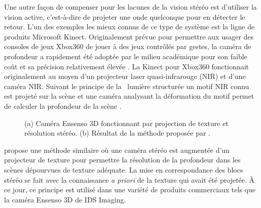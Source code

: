 Une autre façon de compenser pour les lacunes de la vision stéréo est d'utiliser la vision active, c'est-à-dire de projeter une onde quelconque pour en détecter le retour. L'un des exemples les mieux connus de ce type de système est la ligne de produits Microsoft Kinect. Originalement prévue pour permettre aux usager des consoles de jeux Xbox360 de jouer à des jeux contrôlés par gestes, la caméra de profondeur a rapidement été adoptée par le milieu académique pour son faible coût et sa précision relativement élevée \citep{khoshelham2012}. La Kinect pour Xbox360 fonctionnait originalement au moyen d'un projecteur laser quasi-infrarouge (NIR) et d'une caméra NIR. Suivant le principe de la \guillemotleft \ lumière structurée \guillemotright un motif NIR connu est projeté sur la scène et une caméra analysant la déformation du motif permet de calculer la profondeur de la scène \citep{Zhang2012}.

\begin{figure}[!h]
  \centering
  \caption[Caméras 3D par projection de texture]{
    (a) Caméra Ensenso 3D fonctionnant par projection de texture et résolution stéréo.
    (b) Résultat de la méthode proposée par \citep{konolige2010}.
  }
  \label{fig:3d_cams}
\end{figure}

\cite{konolige2010} propose une méthode similaire où une caméra stéréo est augmentée d'un projecteur de texture pour permettre la résolution de la profondeur dans les scènes dépourvues de texture adéquate. La mise en correspondance des blocs stéréo se fait avec la connaissance \textit{a priori} de la texture qui avait été projetée. À ce jour, ce principe est utilisé dans une variété de produits commerciaux tels que la caméra Ensenso 3D de IDS Imaging.

